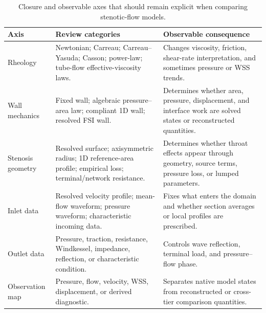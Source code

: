 \begin{table}[!htb]
    \centering
    \scriptsize
    \caption{Closure and observable axes that should remain explicit when
    comparing stenotic-flow models.}
    \label{tab:modeling-closures-observables}
    \begin{tabularx}{\textwidth}{@{}
        >{\raggedright\arraybackslash}p{}
        >{\raggedright\arraybackslash}p{}
        >{\raggedright\arraybackslash}X@{}}
        \toprule
        \textbf{Axis}
            & \textbf{Review categories}
            & \textbf{Observable consequence} \\
        \midrule
        Rheology
            & Newtonian; Carreau; Carreau--Yasuda; Casson; power-law; tube-flow
            effective-viscosity laws.
            & Changes viscosity, friction, shear-rate interpretation, and sometimes
            pressure or WSS trends. \\
        Wall mechanics
            & Fixed wall; algebraic pressure--area law; compliant 1D wall;
            resolved FSI wall.
            & Determines whether area, pressure, displacement, and interface work are
            solved states or reconstructed quantities. \\
        Stenosis geometry
            & Resolved surface; axisymmetric radius; 1D reference-area profile;
            empirical loss; terminal/network resistance.
            & Determines whether throat effects appear through geometry, source
            terms, pressure loss, or lumped parameters. \\
        Inlet data
            & Resolved velocity profile; mean-flow waveform; pressure waveform;
            characteristic incoming data.
            & Fixes what enters the domain and whether section averages or local
            profiles are prescribed. \\
        Outlet data
            & Pressure, traction, resistance, Windkessel, impedance, reflection, or
            characteristic condition.
            & Controls wave reflection, terminal load, and pressure--flow phase. \\
        Observation map
            & Pressure, flow, velocity, WSS, displacement, or derived diagnostic.
            & Separates native model states from reconstructed or cross-tier
            comparison quantities. \\
        \bottomrule
    \end{tabularx}
\end{table}

